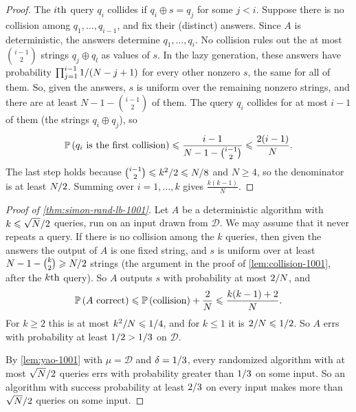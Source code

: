 \begin{proof}
    The $i\text{th}$ query $q_i$ collides if $q_i \oplus s = q_j$ for some $j < i$. Suppose there is no
    collision among $q_1, \dots, q_{i-1}$, and fix their (distinct) answers. Since $A$ is
    deterministic, the answers determine $q_1, \dots, q_i$. No collision rules out the at most
    $\binom{i-1}{2}$ strings $q_j \oplus q_l$ as values of $s$. In the lazy generation, these answers
    have probability $\prod_{j=1}^{i-1} 1/(N-j+1)$ for every other nonzero $s$, the same for
    all of them. So, given the answers, $s$ is uniform over the remaining nonzero strings, and there
    are at least $N - 1 - \binom{i-1}{2}$ of them. The query $q_i$ collides for at most $i - 1$ of
    them (the strings $q_i \oplus q_j$), so
    \[\operatorname{\mathbb{P}}\left(q_i \text{ is the first collision}\right) \leqslant \frac{i-1}{N - 1 - \binom{i-1}{2}} \leqslant \frac{2(i-1)}{N}.\]
    The last step holds because $\binom{i-1}{2} \leqslant k^2/2 \leqslant N/8$ and $N \geq 4$,
    so the denominator is at least $N/2$. Summing over $i = 1, \dots, k$ gives
    $\frac{k(k-1)}{N}$.
\end{proof}

\begin{proof}[Proof of \cref{thm:simon-rand-lb-1001}]
    Let $A$ be a deterministic algorithm with $k \leqslant \sqrt{N}/2$ queries, run on an input
    drawn from $\mathcal{D}$. We may assume that it never repeats a query. If there is no collision
    among the $k$ queries, then given the answers the output of $A$ is one fixed string, and $s$ is
    uniform over at least $N - 1 - \binom{k}{2} \geqslant N/2$ strings (the argument in the proof
    of \cref{lem:collision-1001}, after the $k\text{th}$ query). So $A$ outputs $s$ with probability at
    most $2/N$, and
    \[\operatorname{\mathbb{P}}\left(A \text{ correct}\right) \leqslant \operatorname{\mathbb{P}}\left(\text{collision}\right) + \frac{2}{N} \leqslant \frac{k(k-1) + 2}{N}.\]
    For $k \geq 2$ this is at most $k^2/N \leqslant 1/4$, and for $k \leq 1$ it is
    $2/N \leqslant 1/2$. So $A$ errs with probability at least
    $1/2 > 1/3$ on $\mathcal{D}$.

    By \cref{lem:yao-1001} with $\mu = \mathcal{D}$ and $\delta = 1/3$, every randomized
    algorithm with at most $\sqrt{N}/2$ queries errs with probability greater than
    $1/3$ on some input. So an algorithm with success probability at least $2/3$
    on every input makes more than $\sqrt{N}/2$ queries on some input.
\end{proof}

